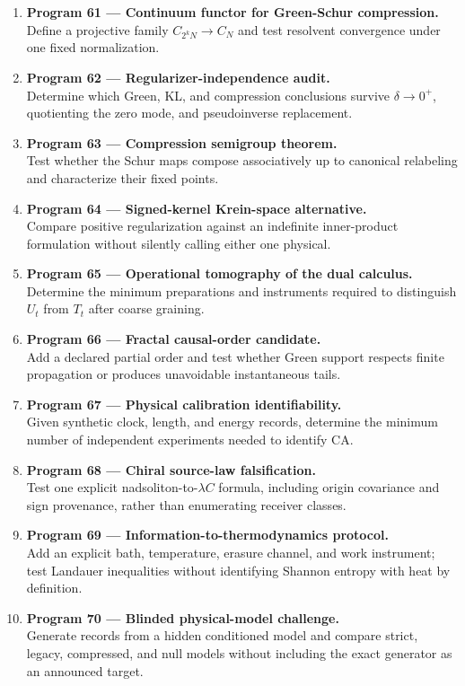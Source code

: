 \documentclass[11pt,a4paper,openany]{report}
\begin{document}
\begin{enumerate}
\item 
\textbf{Program 61 — Continuum functor for Green-Schur compression.}\\
Define a projective family \(C_{2^kN}\to C_N\) and test resolvent convergence under one fixed normalization.

\item 
\textbf{Program 62 — Regularizer-independence audit.}\\
Determine which Green, KL, and compression conclusions survive \(\delta\to0^+\), quotienting the zero mode, and pseudoinverse replacement.

\item 
\textbf{Program 63 — Compression semigroup theorem.}\\
Test whether the Schur maps compose associatively up to canonical relabeling and characterize their fixed points.

\item 
\textbf{Program 64 — Signed-kernel Krein-space alternative.}\\
Compare positive regularization against an indefinite inner-product formulation without silently calling either one physical.

\item 
\textbf{Program 65 — Operational tomography of the dual calculus.}\\
Determine the minimum preparations and instruments required to distinguish \(U_t\) from \(T_t\) after coarse graining.

\item 
\textbf{Program 66 — Fractal causal-order candidate.}\\
Add a declared partial order and test whether Green support respects finite propagation or produces unavoidable instantaneous tails.

\item 
\textbf{Program 67 — Physical calibration identifiability.}\\
Given synthetic clock, length, and energy records, determine the minimum number of independent experiments needed to identify CA.

\item 
\textbf{Program 68 — Chiral source-law falsification.}\\
Test one explicit nadsoliton-to-\(\lambda C\) formula, including origin covariance and sign provenance, rather than enumerating receiver classes.

\item 
\textbf{Program 69 — Information-to-thermodynamics protocol.}\\
Add an explicit bath, temperature, erasure channel, and work instrument; test Landauer inequalities without identifying Shannon entropy with heat by definition.

\item 
\textbf{Program 70 — Blinded physical-model challenge.}\\
Generate records from a hidden conditioned model and compare strict, legacy, compressed, and null models without including the exact generator as an announced target.

\end{enumerate}
\end{document}
